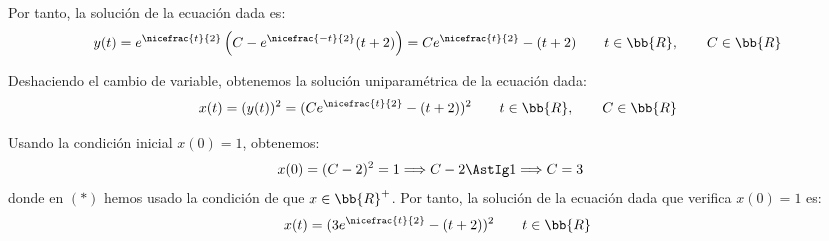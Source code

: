 \begin{ejercicio}
    Por tanto, la solución de la ecuación dada es:
    \begin{equation*}
        y(t) = e^{\nicefrac{t}{2}}\left(C-e^{\nicefrac{-t}{2}}(t+2)\right) = Ce^{\nicefrac{t}{2}} - (t+2) \qquad t\in \bb{R}, \qquad C\in \bb{R}
    \end{equation*}

    Deshaciendo el cambio de variable, obtenemos la solución uniparamétrica de la ecuación dada:
    \begin{equation*}
        x(t) = (y(t))^2 = (Ce^{\nicefrac{t}{2}} - (t+2))^2 \qquad t\in \bb{R}, \qquad C\in \bb{R}
    \end{equation*}

    Usando la condición inicial $x(0)=1$, obtenemos:
    \begin{align*}
        x(0) &= (C-2)^2 = 1 \Longrightarrow C-2 \AstIg 1 \Longrightarrow C=3
    \end{align*}
    donde en $(\ast)$ hemos usado la condición de que $x\in \bb{R}^+$.
    Por tanto, la solución de la ecuación dada que verifica $x(0)=1$ es:
    \begin{equation*}
        x(t) = (3e^{\nicefrac{t}{2}} - (t+2))^2 \qquad t\in \bb{R}
    \end{equation*}
\end{ejercicio}

